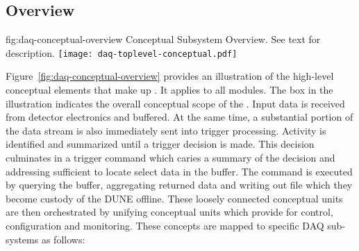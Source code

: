 \subsection{Overview}
\label{sec:fd-daq:design-overview}

\begin{dunefigure}{fig:daq-conceptual-overview}{ Conceptual
    Subsystem Overview.  See text for description.}
  \texttt{[image: daq-toplevel-conceptual.pdf]}
\end{dunefigure}


Figure~\ref{fig:daq-conceptual-overview} provides an illustration of the high-level conceptual elements that make up   . 
It applies to all  modules. 
The box in the illustration indicates the overall conceptual scope of the .
Input data is received from detector electronics and buffered. 
At the same time, a substantial portion of the data stream is also immediately sent into trigger processing. 
Activity is identified and summarized until a trigger decision is made. 
This decision culminates in a trigger command which caries a summary of the decision and addressing sufficient to locate select data in the buffer.
The command is executed by querying the buffer, aggregating returned data and writing out file which they become custody of the DUNE offline.
These loosely connected conceptual units are then orchestrated by unifying conceptual units which provide for control, configuration and monitoring.
These concepts are mapped to specific DAQ sub-systems as follows:

